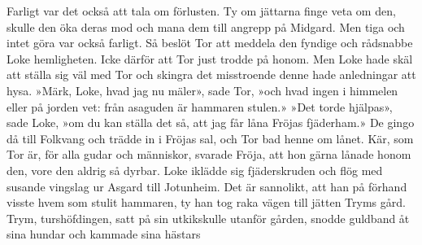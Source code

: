 Farligt var det också att tala om förlusten. Ty om jättarna finge veta
om den, skulle den öka deras mod och mana dem till angrepp på Midgard.
Men tiga och intet göra var också farligt. Så beslöt Tor att meddela den
fyndige och rådsnabbe Loke hemligheten. Icke därför att Tor just trodde
på honom. Men Loke hade skäl att ställa sig väl med Tor och skingra det
misstroende denne hade anledningar att hysa. »Märk, Loke, hvad jag nu
mäler», sade Tor, »och hvad ingen i himmelen eller på jorden vet: från
asaguden är hammaren stulen.» »Det torde hjälpas», sade Loke, »om du kan
ställa det så, att jag får låna Fröjas fjäderham.» De gingo då till
Folkvang och trädde in i Fröjas sal, och Tor bad henne om lånet. Kär,
som Tor är, för alla gudar och människor, svarade Fröja, att hon gärna
lånade honom den, vore den aldrig så dyrbar. Loke iklädde sig
fjäderskruden och flög med susande vingslag ur Asgard till Jotunheim.
Det är sannolikt, att han på förhand visste hvem som stulit hammaren, ty
han tog raka vägen till jätten Tryms gård. Trym, turshöfdingen, satt på
sin utkikskulle utanför gården, snodde guldband åt sina hundar och
kammade sina hästars

